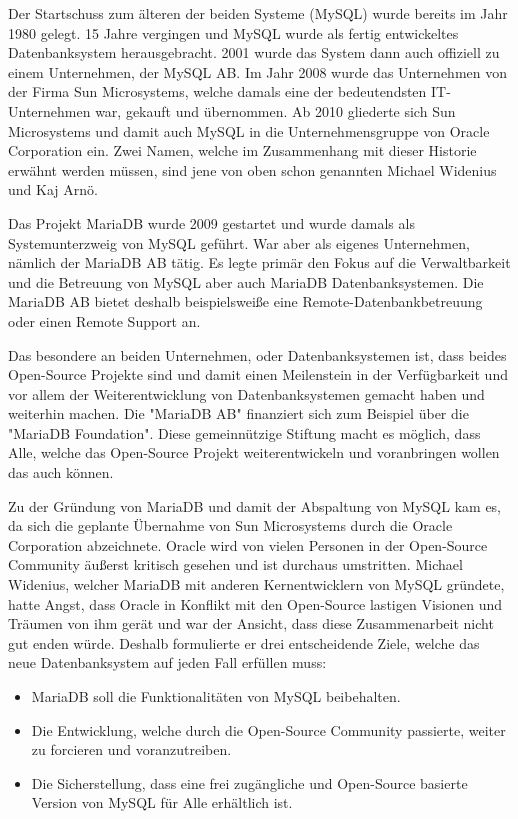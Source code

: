 
Der Startschuss zum älteren der beiden Systeme (MySQL) wurde bereits im Jahr 1980 gelegt. 15 Jahre vergingen und MySQL wurde als fertig entwickeltes Datenbanksystem herausgebracht. 2001 wurde das System dann auch offiziell zu einem Unternehmen, der MySQL AB. Im Jahr 2008 wurde das Unternehmen von der Firma Sun Microsystems, welche damals eine der bedeutendsten IT-Unternehmen war, gekauft und übernommen. Ab 2010 gliederte sich Sun Microsystems und damit auch MySQL in die Unternehmensgruppe von Oracle Corporation ein. Zwei Namen, welche im Zusammenhang mit dieser Historie erwähnt werden müssen, sind jene von oben schon genannten Michael Widenius und Kaj Arnö. \cite{MariaMy}

Das Projekt MariaDB wurde 2009 gestartet und wurde damals als Systemunterzweig von MySQL geführt. War aber als eigenes Unternehmen, nämlich der MariaDB AB tätig. Es legte primär den Fokus auf die Verwaltbarkeit und die Betreuung von MySQL aber auch MariaDB Datenbanksystemen. Die MariaDB AB bietet deshalb beispielsweiße eine Remote-Datenbankbetreuung oder einen Remote Support an. \cite{MariaMy}

Das besondere an beiden Unternehmen, oder Datenbanksystemen ist, dass beides Open-Source Projekte sind und damit einen Meilenstein in der Verfügbarkeit und vor allem der Weiterentwicklung von Datenbanksystemen gemacht haben und weiterhin machen. Die "MariaDB AB" finanziert sich zum Beispiel über die "MariaDB Foundation". Diese gemeinnützige Stiftung macht es möglich, dass Alle, welche das Open-Source Projekt weiterentwickeln und voranbringen wollen das auch können. \cite{MariaMy}

Zu der Gründung von MariaDB und damit der Abspaltung von MySQL kam es, da sich die geplante Übernahme von Sun Microsystems durch die Oracle Corporation abzeichnete. Oracle wird von vielen Personen in der Open-Source Community äußerst kritisch gesehen und ist durchaus umstritten. Michael Widenius, welcher MariaDB mit anderen Kernentwicklern von MySQL gründete, hatte Angst, dass Oracle in Konflikt mit den Open-Source lastigen Visionen und Träumen von ihm gerät und war der Ansicht, dass diese Zusammenarbeit nicht gut enden würde. Deshalb formulierte er drei entscheidende Ziele, welche das neue Datenbanksystem auf jeden Fall erfüllen muss: \cite{MariaMy}

\begin{itemize}
    \item MariaDB soll die Funktionalitäten von MySQL beibehalten.
    \item Die Entwicklung, welche durch die Open-Source Community passierte, weiter zu forcieren und voranzutreiben.
    \item Die Sicherstellung, dass eine frei zugängliche und Open-Source basierte Version von MySQL für Alle erhältlich ist.
\end{itemize}

\cite{MariaMy}